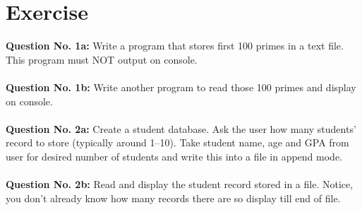 \documentclass[12pt,a4paper]{article}
\begin{document}
\section{Exercise}
\textbf{Question No. 1a:} Write a program that stores first 100 primes in a text file. This program must NOT output on console.\\
\\
\textbf{Question No. 1b:} Write another program to read those 100 primes and display on console.\\
\\
\textbf{Question No. 2a:} Create a student database. Ask the user how many students' record to store (typically around 1--10). Take student name, age and GPA from user for desired number of students and write this into a file in append mode.\\
\\
\textbf{Question No. 2b:} Read and display the student record stored in a file. Notice, you don't already know how many records there are so display till end of file.
\end{document}
